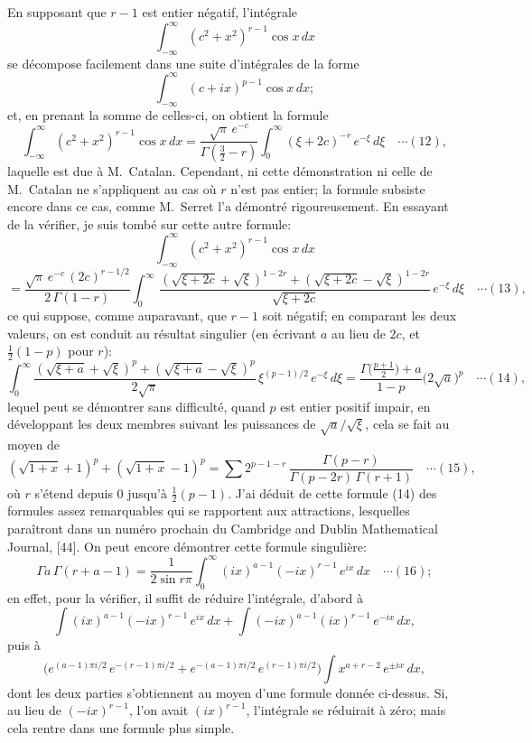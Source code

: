 \documentclass[12pt,a4paper]{article}
\begin{document}
En supposant que $r - 1$ est entier n\'egatif, l'int\'egrale
\[
\int_{-\infty}^{\infty}(c^2 + x^2)^{r-1}\cos x\,dx
\]
se d\'ecompose facilement dans une suite d'int\'egrales de la forme
\[
\int_{-\infty}^{\infty}(c + ix)^{p-1}\cos x\,dx;
\]
et, en prenant la somme de celles-ci, on obtient la formule
\[
\int_{-\infty}^{\infty}(c^2 + x^2)^{r-1}\cos x\,dx = \frac{\sqrt{\pi}\,e^{-c}}{\Gamma(\tfrac32 - r)}\int_0^\infty(\xi + 2c)^{-r}\,e^{-\xi}\,d\xi \quad\cdots(12),
\]
laquelle est due \`a M.\ Catalan. Cependant, ni cette d\'emonstration ni celle de M.\ Catalan ne s'appliquent au cas o\`u $r$ n'est pas entier; la formule subsiste encore dans ce cas, comme M.\ Serret l'a d\'emontr\'e rigoureusement. En essayant de la v\'erifier, je suis tomb\'e sur cette autre formule:
\[
\int_{-\infty}^{\infty}(c^2 + x^2)^{r-1}\cos x\,dx
\]
\[
= \frac{\sqrt{\pi}\,e^{-c}\,(2c)^{r - 1/2}}{2\,\Gamma(1 - r)}\int_0^\infty\,\frac{(\sqrt{\xi + 2c} + \sqrt{\xi})^{1 - 2r} + (\sqrt{\xi + 2c} - \sqrt{\xi})^{1 - 2r}}{\sqrt{\xi + 2c}}\,e^{-\xi}\,d\xi \quad\cdots(13),
\]
ce qui suppose, comme auparavant, que $r - 1$ soit n\'egatif; en comparant les deux valeurs, on est conduit au r\'esultat singulier (en \'ecrivant $a$ au lieu de $2c$, et $\tfrac12(1 - p)$ pour $r$):
\[
\int_0^\infty\frac{(\sqrt{\xi + a} + \sqrt{\xi})^p + (\sqrt{\xi + a} - \sqrt{\xi})^p}{2\sqrt{\pi}}\,\xi^{(p-1)/2}\,e^{-\xi}\,d\xi = \frac{\Gamma\bigl(\tfrac{p+1}{2}\bigr) + a}{1 - p}\bigl(2\sqrt{a}\bigr)^p \quad\cdots(14),
\]
lequel peut se d\'emontrer sans difficult\'e, quand $p$ est entier positif impair, en d\'eveloppant les deux membres suivant les puissances de $\sqrt{a}/\sqrt{\xi}$, cela se fait au moyen de
\[
(\sqrt{1 + x} + 1)^p + (\sqrt{1 + x} - 1)^p = \sum 2^{p - 1 - r}\,\frac{\Gamma(p - r)}{\Gamma(p - 2r)\,\Gamma(r + 1)} \quad\cdots(15),
\]
o\`u $r$ s'\'etend depuis 0 jusqu'\`a $\tfrac12(p - 1)$. J'ai d\'eduit de cette formule (14) des formules assez remarquables qui se rapportent aux attractions, lesquelles para\^itront dans un num\'ero prochain du Cambridge and Dublin Mathematical Journal, [44]. On peut encore d\'emontrer cette formule singuli\`ere:
\[
\Gamma a\,\Gamma(r + a - 1) = \frac{1}{2\sin r\pi}\int_0^\infty (ix)^{a-1}(-ix)^{r-1}\,e^{ix}\,dx \quad\cdots(16);
\]
en effet, pour la v\'erifier, il suffit de r\'eduire l'int\'egrale, d'abord \`a
\[
\int(ix)^{a-1}(-ix)^{r-1}\,e^{ix}\,dx + \int(-ix)^{a-1}(ix)^{r-1}\,e^{-ix}\,dx,
\]
puis \`a
\[
\bigl(e^{(a-1)\pi i/2}\,e^{-(r-1)\pi i/2} + e^{-(a-1)\pi i/2}\,e^{(r-1)\pi i/2}\bigr)\int x^{a+r-2}\,e^{\pm ix}\,dx,
\]
dont les deux parties s'obtiennent au moyen d'une formule donn\'ee ci-dessus. Si, au lieu de $(-ix)^{r-1}$, l'on avait $(ix)^{r-1}$, l'int\'egrale se r\'eduirait \`a z\'ero; mais cela rentre dans une formule plus simple.
\end{document}
